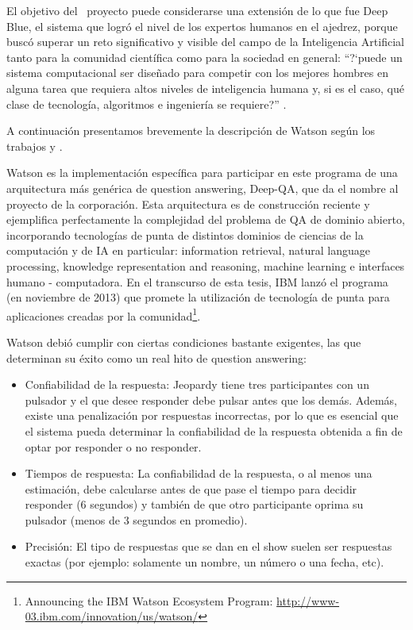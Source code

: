 El objetivo del \ proyecto puede considerarse una extensión de lo que
fue Deep Blue, el sistema que logró el nivel de los expertos humanos
en el ajedrez, porque buscó superar un reto  significativo y
visible del campo de la Inteligencia Artificial tanto para la comunidad
científica como para la sociedad en general:
{\textquotedblleft}?`puede un sistema computacional ser diseñado para
competir con los mejores hombres en alguna tarea que requiera altos
niveles de inteligencia humana y, si es el caso, qué clase de
tecnología, algoritmos e ingeniería se
requiere?{\textquotedblright} \cite{WATSON1}.

\medskip

A continuación presentamos brevemente la descripción de Watson según los trabajos \cite{WATSON1} y \cite{WATSON2}.

\medskip

Watson es la implementación específica para participar en este
programa de una arquitectura más genérica de question answering,
Deep-QA, que da el nombre al proyecto de la corporación. Esta
arquitectura es de construcción reciente y ejemplifica perfectamente la complejidad del problema de
QA de dominio abierto, incorporando tecnologías de punta de distintos
dominios de ciencias de la computación y de IA en particular:
information retrieval, natural language processing, knowledge
representation and reasoning, machine learning e interfaces humano -
computadora. En el transcurso de esta tesis, IBM lanzó el programa
 (en noviembre de 2013) que promete la utilización
de tecnología de punta para aplicaciones creadas por la comunidad\footnote{
Announcing the IBM Watson Ecosystem Program: \url{http://www-03.ibm.com/innovation/us/watson/}}.

Watson debió cumplir con ciertas condiciones bastante exigentes, las que determinan su éxito como un real hito de question answering:


\begin{itemize}
\item Confiabilidad de la respuesta: \newline
Jeopardy tiene tres participantes con un pulsador y el que desee
responder debe pulsar antes que los demás. Además, existe una
penalización por respuestas incorrectas, por lo que es esencial que
el sistema pueda determinar la confiabilidad de la respuesta obtenida a
fin de optar por responder o no responder.
\item Tiempos de respuesta: \newline
La confiabilidad de la respuesta, o al menos una estimación, debe
calcularse antes de que pase el tiempo para decidir responder (6
segundos) y también de que otro participante oprima su pulsador
(menos de 3 segundos en promedio).
\item Precisión:\newline
El tipo de respuestas que se dan en el show suelen ser respuestas
exactas (por ejemplo: solamente un nombre, un número o una fecha,
etc).
\end{itemize}

